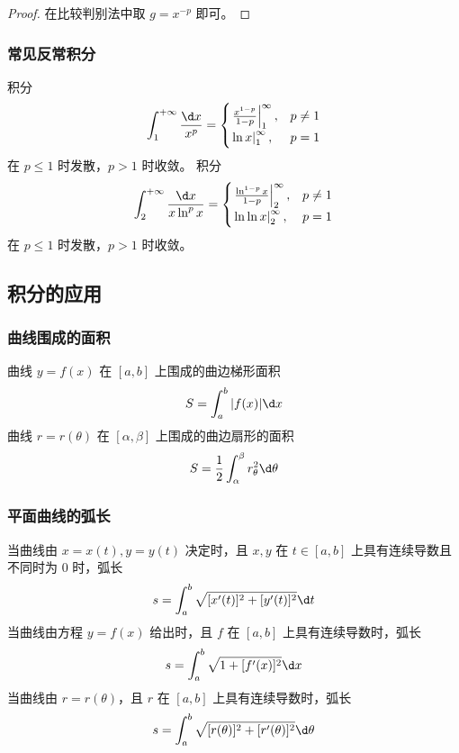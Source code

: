 \begin{proof}
	在比较判别法中取 $g = x^{-p}$ 即可。
\end{proof}

\subsubsection*{常见反常积分}

积分
\[ \int_{1}^{+\infty} \frac{\d x}{x^p} = \begin{cases}
		\left.\frac{x^{1-p}}{1-p}\right|_{1}^{\infty}, & p \neq 1 \\
		\left.\ln  x\right|_{1}^{\infty},              & p = 1
	\end{cases} \]
在 $p \leqslant 1$ 时发散，$p>1$ 时收敛。
积分
\[ \int_{2}^{+\infty} \frac{\d x}{x \ln^p x} = \begin{cases}
		\left.\frac{\ln^{1-p} x}{1 - p}\right|_{2}^{\infty}, & p \neq 1 \\
		\left.\ln \ln x\right|_{2}^{\infty},                 & p = 1
	\end{cases} \]
在 $p \leqslant 1$ 时发散，$p > 1$ 时收敛。

\subsection{积分的应用}

\subsubsection*{曲线围成的面积}

曲线 $y = f(x)$ 在 $[a, b]$ 上围成的曲边梯形面积
\[ S = \int_{a}^{b} |f(x)| \d x \]
曲线 $r = r(\theta)$ 在 $[\alpha, \beta]$ 上围成的曲边扇形的面积
\[ S = \frac{1}{2} \int_{\alpha}^{\beta} r_{\theta}^2 \d \theta \]

\subsubsection*{平面曲线的弧长}

当曲线由 $x = x(t), y = y(t)$ 决定时，且 $x, y$ 在 $t \in [a, b]$ 上具有连续导数且不同时为 $0$ 时，弧长
\[ s = \int_{a}^{b} \sqrt{[x'(t)]^2 + [y'(t)]^2} \d t \]
当曲线由方程 $y = f(x)$ 给出时，且 $f$ 在 $[a, b]$ 上具有连续导数时，弧长
\[ s = \int_{a}^{b} \sqrt{1 + [f'(x)]^2} \d x \]
当曲线由 $r = r(\theta)$，且 $r$ 在 $[a, b]$ 上具有连续导数时，弧长
\[ s = \int_{a}^{b} \sqrt{[r(\theta)]^2 + [r'(\theta)]^2} \d \theta \]



